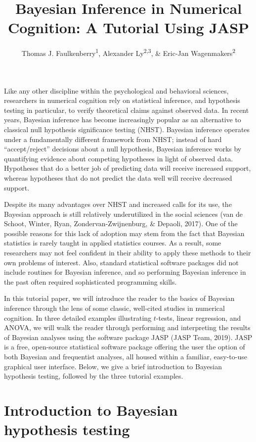 \documentclass[english,,doc,floatsintext]{apa6}
\title{Bayesian Inference in Numerical Cognition: A Tutorial Using JASP}
\author{Thomas J. Faulkenberry\textsuperscript{1}, Alexander Ly\textsuperscript{2,3}, \& Eric-Jan Wagenmakers\textsuperscript{2}}
\date{}
\begin{document}
\maketitle

Like any other discipline within the psychological and behavioral sciences, researchers in numerical cognition rely on statistical inference, and hypothesis testing in particular, to verify theoretical claims against observed data. In recent years, Bayesian inference has become increasingly popular as an alternative to classical null hypothesis significance testing (NHST). Bayesian inference operates under a fundamentally different framework from NHST; instead of hard ``accept/reject'' decisions about a null hypothesis, Bayesian inference works by quantifying evidence about competing hypotheses in light of observed data. Hypotheses that do a better job of predicting data will receive increased support, whereas hypotheses that do not predict the data well will receive decreased support.

Despite its many advantages over NHST and increased calls for its use, the Bayesian approach is still relatively underutilized in the social sciences (van de Schoot, Winter, Ryan, Zondervan-Zwijnenburg, \& Depaoli, 2017). One of the possible reasons for this lack of adoption may stem from the fact that Bayesian statistics is rarely taught in applied statistics courses. As a result, some researchers may not feel confident in their ability to apply these methods to their own problems of interest. Also, standard statistical software packages did not include routines for Bayesian inference, and so performing Bayesian inference in the past often required sophisticated programming skills.

In this tutorial paper, we will introduce the reader to the basics of Bayesian inference through the lens of some classic, well-cited studies in numerical cognition. In three detailed examples illustrating \(t\)-tests, linear regression, and ANOVA, we will walk the reader through performing and interpreting the results of Bayesian analyses using the software package JASP (JASP Team, 2019). JASP is a free, open-source statistical software package offering the user the option of both Bayesian and frequentist analyses, all housed within a familiar, easy-to-use graphical user interface. Below, we give a brief introduction to Bayesian hypothesis testing, followed by the three tutorial examples.

\hypertarget{introduction-to-bayesian-hypothesis-testing}{%
\section{Introduction to Bayesian hypothesis testing}\label{introduction-to-bayesian-hypothesis-testing}}
\end{document}
